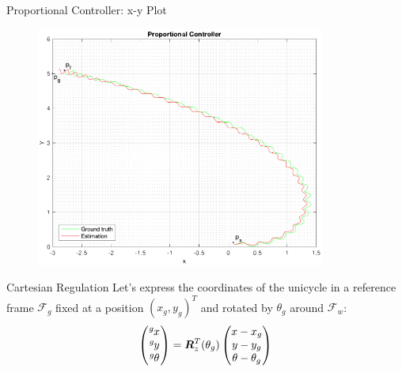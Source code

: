 \documentclass[10pt]{beamer}
\begin{document}
    \begin{frame}{Proportional Controller: x-y Plot}
        \begin{figure}
            \includegraphics[width=0.85\textwidth]{images/proportional_controller.png}
        \end{figure}
    \end{frame}

    \begin{frame}{Cartesian Regulation}
        \justifying
        Let's express the coordinates of the unicycle in a reference frame
        $\mathcal{F}_g$ fixed at a position $(x_g, y_g)^T$ and
        rotated by $\theta_g$ around $\mathcal{F}_w$:
        \begin{equation*}
            \begin{pmatrix}
                \tensor[^g]{x}{} \\
                \tensor[^g]{y}{} \\
                \tensor[^g]{\theta}{}
            \end{pmatrix}
                =
            \bm{R}_z^T(\theta_g)
            \begin{pmatrix}
                x - x_g \\
                y - y_g \\
                \theta - \theta_g
            \end{pmatrix}
        \end{equation*}
    \end{frame}
\end{document}
